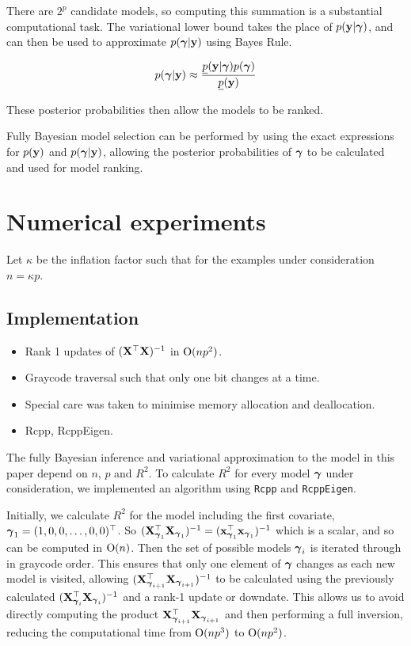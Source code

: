 \documentclass{amsart}[12pt]
\begin{document}
\noindent There are $2^p$ candidate models, so computing this summation is a substantial computational task. The
variational lower bound takes the place of $p({\bf y}|{\boldsymbol \gamma})$, and can then be used to approximate
$p({\boldsymbol \gamma}|{\bf y})$ using Bayes Rule.

$$p({\boldsymbol \gamma}|{\bf y})     \approx \frac{\underline{p}({\bf y}|{\boldsymbol \gamma}) p({\boldsymbol \gamma})}{\underline{p}({\bf y})}$$

\noindent These posterior probabilities then allow the models to be ranked.

Fully Bayesian model selection can be performed by using the exact expressions for $p({\bf y})$ and $p({\boldsymbol \gamma}|{\bf y})$, allowing the posterior probabilities of ${\boldsymbol \gamma}$ to be calculated and used for model ranking.

\section{Numerical experiments}
\label{sec:num_exp}

Let $\kappa$ be the inflation factor such that for the examples under consideration $n = \kappa p$.

\subsection{Implementation}
\label{sec:implementation}

\begin{itemize}
\item Rank 1 updates of $({\bf X}^\top {\bf X})^{-1}$ in $\text{O}(np^2)$.
\item Graycode traversal such that only one bit changes at a time.
\item Special care was taken to minimise memory allocation and deallocation.
\item Rcpp, RcppEigen.
\end{itemize}

The fully Bayesian inference and variational approximation to the model in this paper depend on $n$, $p$ and
$R^2$. To calculate $R^2$ for every model ${\boldsymbol \gamma}$ under consideration, we implemented an algorithm using
\texttt{Rcpp} and \texttt{RcppEigen}.

Initially, we calculate $R^2$ for the model including the first covariate, ${\boldsymbol \gamma}_1 = (1, 0, 0, \ldots, 0,
0)^\top$. So $({\bf X}_{{\boldsymbol \gamma}_1}^\top {\bf X}_{{\boldsymbol \gamma}_1})^{-1} = ({\bf x}_{{\boldsymbol \gamma}_1}^\top {\bf x}_{{\boldsymbol \gamma}_1})^{-1}$ which
is a scalar, and so can be computed in $\text{O}(n)$. Then the set of possible models ${\boldsymbol \gamma}_i$ is iterated
through in graycode order. This ensures that only one element of ${\boldsymbol \gamma}$ changes as each new model is
visited, allowing $({\bf X}_{{\boldsymbol \gamma}_{i+1}}^\top {\bf X}_{{\boldsymbol \gamma}_{i+1}})^{-1}$ to be calculated using the previously
calculated $({\bf X}_{{\boldsymbol \gamma}_i}^\top {\bf X}_{{\boldsymbol \gamma}_i})^{-1}$ and a rank-1 update or downdate. This allows us to
avoid directly computing the product ${\bf X}_{{\boldsymbol \gamma}_{i+1}}^\top {\bf X}_{{\boldsymbol \gamma}_{i+1}}$ and then performing a full
inversion, reducing the computational time from $\text{O}(n p^3)$  to $\text{O}(n p^2)$.
\end{document}

